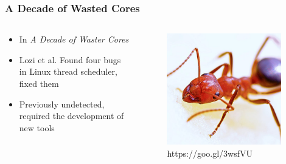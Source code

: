 \documentclass{beamer}
\newcommand{\linespace}{\vskip 0.25cm}
\begin{document}
\begin{frame}
\frametitle{A Decade of Wasted Cores}

\begin{columns}
\begin{column}{0.72\textwidth}
\begin{itemize}
\item In \emph{A Decade of Waster Cores}
\item Lozi et al. Found four bugs in Linux thread scheduler, fixed them

\linespace

\item Previously undetected, required the development of new tools

\end{itemize}
\end{column}
\begin{column}{0.28\textwidth} %
\begin{figure}
\centering
\includegraphics[width=0.95\textwidth]{Illustrations/ant_from_pexels.png}
\caption*{https://goo.gl/3wsfVU}
\end{figure}

\end{column}
\end{columns}

\end{frame}
\end{document}
